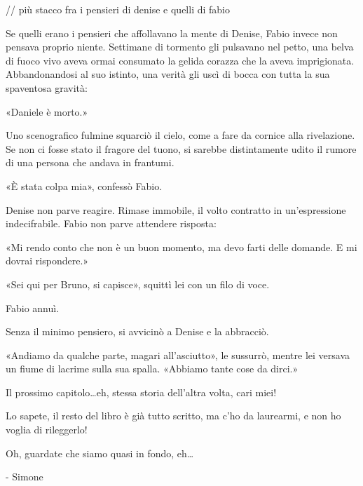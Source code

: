 // più stacco fra i pensieri di denise e quelli di fabio

Se quelli erano i pensieri che affollavano la mente di Denise, Fabio invece non pensava proprio niente. Settimane di tormento gli pulsavano nel petto, una belva di fuoco vivo aveva ormai consumato la gelida corazza che la aveva imprigionata. Abbandonandosi al suo istinto, una verità gli uscì di bocca con tutta la sua spaventosa gravità:

«Daniele è morto.»

Uno scenografico fulmine squarciò il cielo, come a fare da cornice alla rivelazione. Se non ci fosse stato il fragore del tuono, si sarebbe distintamente udito il rumore di una persona che andava in frantumi.

«È stata colpa mia», confessò Fabio.

Denise non parve reagire. Rimase immobile, il volto contratto in un'espressione indecifrabile. Fabio non parve attendere risposta:

«Mi rendo conto che non è un buon momento, ma devo farti delle domande. E mi dovrai rispondere.»

«Sei qui per Bruno, si capisce», squittì lei con un filo di voce.

Fabio annuì.

Senza il minimo pensiero, si avvicinò a Denise e la abbracciò.

«Andiamo da qualche parte, magari all'asciutto», le sussurrò, mentre lei versava un fiume di lacrime sulla sua spalla. «Abbiamo tante cose da dirci.»



Il prossimo capitolo\ldots eh, stessa storia dell'altra volta, cari miei!

Lo sapete, il resto del libro è già tutto scritto, ma c'ho da laurearmi, e non ho voglia di rileggerlo!

Oh, guardate che siamo quasi in fondo, eh\ldots

- Simone
